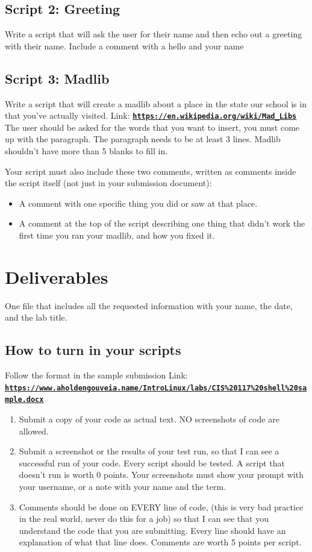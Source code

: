 \documentclass[12pt]{article}
\begin{document}
\subsection*{Script 2: Greeting}
Write a script that will ask the user for their name and then echo out a greeting with their name.  Include a comment with a hello and your name

\subsection*{Script 3: Madlib}
Write a script that will create a madlib about a place in the state our school is in that you've actually visited. Link: \href{https://en.wikipedia.org/wiki/Mad_Libs}{\textbf{\nolinkurl{https://en.wikipedia.org/wiki/Mad_Libs}}}  The user should be asked for the words that you want to insert, you must come up with the paragraph. The paragraph needs to be at least 3 lines. Madlib shouldn't have more than 5 blanks to fill in.

Your script must also include these two comments, written as comments inside the script itself (not just in your submission document):
\begin{itemize}
    \item A comment with one specific thing you did or saw at that place.
    \item A comment at the top of the script describing one thing that didn't work the first time you ran your madlib, and how you fixed it.
\end{itemize}

\section*{Deliverables}
One file that includes all the requested information with your name, the date, and the lab title.

\subsection*{How to turn in your scripts}
Follow the format in the sample submission Link: \href{https://www.aholdengouveia.name/IntroLinux/labs/CIS\%20117\%20shell\%20sample.docx}{\textbf{\nolinkurl{https://www.aholdengouveia.name/IntroLinux/labs/CIS\%20117\%20shell\%20sample.docx}}}
    \begin{enumerate}
        \item Submit a copy of your code as actual text. NO screenshots of code are allowed.
        \item Submit a screenshot or the results of your test run, so that I can see a successful run of your code. Every script should be tested.  A script that doesn't run is worth 0 points. Your screenshots must show your prompt with your username, or a note with your name and the term.
        \item Comments should be done on EVERY line of code, (this is very bad practice in the real world, never do this for a job) so that I can see that you understand the code that you are submitting. Every line should have an explanation of what that line does.  Comments are worth 5 points per script.
\end{enumerate}
\end{document}
